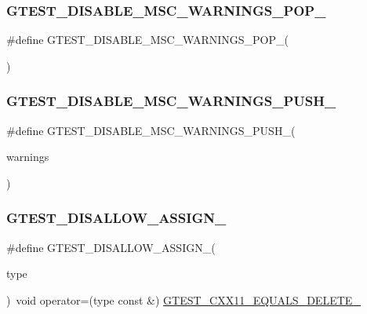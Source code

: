 \subsubsection{\texorpdfstring{GTEST\_DISABLE\_MSC\_WARNINGS\_POP\_}{GTEST\_DISABLE\_MSC\_WARNINGS\_POP\_}}
{\footnotesize\ttfamily \#define G\+T\+E\+S\+T\+\_\+\+D\+I\+S\+A\+B\+L\+E\+\_\+\+M\+S\+C\+\_\+\+W\+A\+R\+N\+I\+N\+G\+S\+\_\+\+P\+O\+P\+\_\+(\begin{DoxyParamCaption}{ }\end{DoxyParamCaption})}

\mbox{\label{gtest-port_8h_a86994cc68e844d8b82089c70408dfc61}} 
\subsubsection{\texorpdfstring{GTEST\_DISABLE\_MSC\_WARNINGS\_PUSH\_}{GTEST\_DISABLE\_MSC\_WARNINGS\_PUSH\_}}
{\footnotesize\ttfamily \#define G\+T\+E\+S\+T\+\_\+\+D\+I\+S\+A\+B\+L\+E\+\_\+\+M\+S\+C\+\_\+\+W\+A\+R\+N\+I\+N\+G\+S\+\_\+\+P\+U\+S\+H\+\_\+(\begin{DoxyParamCaption}\item[{}]{warnings }\end{DoxyParamCaption})}

\mbox{\label{gtest-port_8h_ac593b50ce24257d5b6aa84845c344c9e}} 
\subsubsection{\texorpdfstring{GTEST\_DISALLOW\_ASSIGN\_}{GTEST\_DISALLOW\_ASSIGN\_}}
{\footnotesize\ttfamily \#define G\+T\+E\+S\+T\+\_\+\+D\+I\+S\+A\+L\+L\+O\+W\+\_\+\+A\+S\+S\+I\+G\+N\+\_\+(\begin{DoxyParamCaption}\item[{}]{type }\end{DoxyParamCaption})~void operator=(type const \&) \mbox{\hyperlink{gtest-port_8h_ab229f1a8ec704ba6a97918f9239547c4}{G\+T\+E\+S\+T\+\_\+\+C\+X\+X11\+\_\+\+E\+Q\+U\+A\+L\+S\+\_\+\+D\+E\+L\+E\+T\+E\+\_\+}}}

